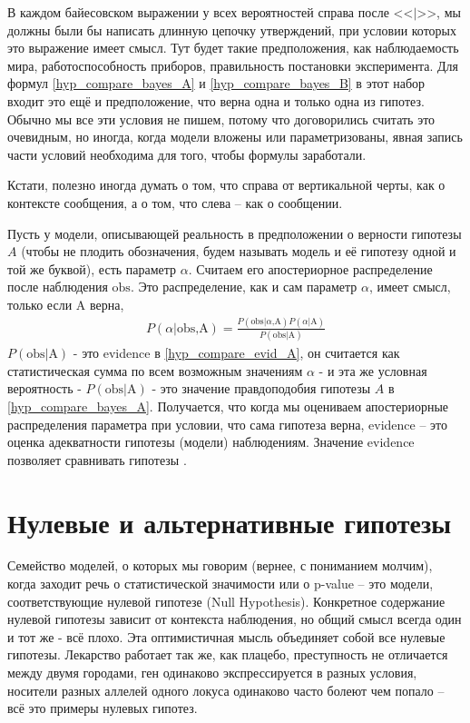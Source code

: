 \documentclass{book}
\begin{document}
В каждом байесовском выражении у всех вероятностей справа после <<$\text{|}$>>, мы должны были бы написать длинную цепочку утверждений, при условии которых это выражение имеет смысл. Тут будет такие предположения, как наблюдаемость мира, работоспособность приборов, правильность постановки эксперимента. Для формул \eqref{hyp_compare_bayes_A} и \eqref{hyp_compare_bayes_B} в этот набор входит это ещё и предположение, что верна одна и только одна из гипотез. Обычно мы все эти условия не пишем, потому что договорились считать это очевидным, но иногда, когда модели вложены или параметризованы, явная запись части условий необходима для того, чтобы формулы заработали.  
 
Кстати, полезно иногда думать о том, что справа от вертикальной черты, как о контексте сообщения, а о том, что слева -- как о сообщении. 
 
Пусть у модели, описывающей реальность в предположении о верности гипотезы $A$ (чтобы не плодить обозначения, будем называть модель и её гипотезу одной и той же буквой),  есть параметр $\alpha$. Считаем его апостериорное распределение после наблюдения $\text{obs}$. Это распределение, как и сам параметр $\alpha$, имеет смысл, только если $\text{A}$ верна,
\begin{align}\label{hyp_compare_evid_A}
   P\left(\alpha\text{|obs,A}\right)=\frac{P\left(\text{obs|}\alpha\text{,A}\right) P\left(\alpha\text{|A}\right)}{P\left(\text{obs|A}\right)}
\end{align}
$P\left(\text{obs|A}\right)$ - это evidence в \eqref{hyp_compare_evid_A}, он считается как статистическая сумма по всем возможным значениям $\alpha$ - и эта же условная вероятность - $P\left(\text{obs|A}\right)$ - это значение правдоподобия гипотезы $A$ в \eqref{hyp_compare_bayes_A}. Получается, что когда мы оцениваем апостериорные распределения параметра при условии, что сама гипотеза верна, evidence -- это оценка адекватности гипотезы (модели) наблюдениям. Значение evidence позволяет сравнивать гипотезы \citep[подробнее см.][]{skilling_nested_2006}.

\section*{Нулевые и альтернативные гипотезы}

Семейство моделей, о которых мы говорим (вернее, с пониманием молчим), когда заходит речь о статистической значимости или о p-value -- это модели, соответствующие нулевой гипотезе (Null Hypothesis). Конкретное содержание нулевой гипотезы зависит от контекста наблюдения, но общий смысл всегда один и тот же - всё плохо. Эта оптимистичная мысль объединяет собой все нулевые гипотезы. Лекарство работает так же, как плацебо, преступность не отличается между двумя городами, ген одинаково экспрессируется в разных условия, носители разных аллелей одного локуса одинаково часто болеют чем попало -- всё это примеры нулевых гипотез. 
\end{document}
